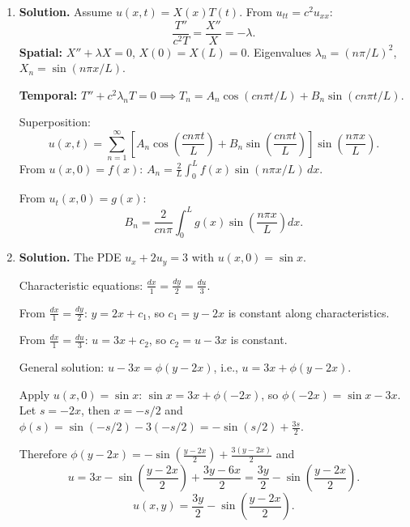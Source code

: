 \begin{enumerate}
\textbf{$Y$-problem:} $Y''-\lambda_n Y=0$, $Y(0)=0$. General solution: $Y=A\cosh(n\pi y/L)+B\sinh(n\pi y/L)$. From $Y(0)=0$: $A=0$, so $Y_n=\sinh(n\pi y/L)$.

Superposition:
\[
u(x,y)=\sum_{n=1}^{\infty}B_n\sin\!\left(\frac{n\pi x}{L}\right)\sinh\!\left(\frac{n\pi y}{L}\right).
\]
Apply $u(x,H)=g(x)$:
\[
g(x)=\sum_{n=1}^{\infty}B_n\sinh\!\left(\frac{n\pi H}{L}\right)\sin\!\left(\frac{n\pi x}{L}\right).
\]
\[
\boxed{B_n = \frac{2}{L\sinh(n\pi H/L)}\int_0^L g(x)\sin\!\left(\frac{n\pi x}{L}\right)dx}.
\]

\item \textbf{Solution.}
Assume $u(x,t)=X(x)T(t)$. From $u_{tt}=c^2 u_{xx}$:
\[
\frac{T''}{c^2 T}=\frac{X''}{X}=-\lambda.
\]
\textbf{Spatial:} $X''+\lambda X=0$, $X(0)=X(L)=0$. Eigenvalues $\lambda_n=(n\pi/L)^2$, $X_n=\sin(n\pi x/L)$.

\textbf{Temporal:} $T''+c^2\lambda_n T=0 \implies T_n=A_n\cos(cn\pi t/L)+B_n\sin(cn\pi t/L)$.

Superposition:
\[
u(x,t)=\sum_{n=1}^{\infty}\left[A_n\cos\!\left(\frac{cn\pi t}{L}\right)+B_n\sin\!\left(\frac{cn\pi t}{L}\right)\right]\sin\!\left(\frac{n\pi x}{L}\right).
\]
From $u(x,0)=f(x)$: $A_n=\frac{2}{L}\int_0^L f(x)\sin(n\pi x/L)\,dx$.

From $u_t(x,0)=g(x)$:
\[
\boxed{B_n = \frac{2}{cn\pi}\int_0^L g(x)\sin\!\left(\frac{n\pi x}{L}\right)dx}.
\]

\item \textbf{Solution.}
The PDE $u_x+2u_y=3$ with $u(x,0)=\sin x$.

Characteristic equations: $\frac{dx}{1}=\frac{dy}{2}=\frac{du}{3}$.

From $\frac{dx}{1}=\frac{dy}{2}$: $y=2x+c_1$, so $c_1=y-2x$ is constant along characteristics.

From $\frac{dx}{1}=\frac{du}{3}$: $u=3x+c_2$, so $c_2=u-3x$ is constant.

General solution: $u-3x=\phi(y-2x)$, i.e., $u=3x+\phi(y-2x)$.

Apply $u(x,0)=\sin x$: $\sin x = 3x+\phi(-2x)$, so $\phi(-2x)=\sin x-3x$. Let $s=-2x$, then $x=-s/2$ and $\phi(s)=\sin(-s/2)-3(-s/2)=-\sin(s/2)+\frac{3s}{2}$.

Therefore $\phi(y-2x)=-\sin\!\left(\frac{y-2x}{2}\right)+\frac{3(y-2x)}{2}$ and
\[
u = 3x-\sin\!\left(\frac{y-2x}{2}\right)+\frac{3y-6x}{2} = \frac{3y}{2}-\sin\!\left(\frac{y-2x}{2}\right).
\]
\[
\boxed{u(x,y)=\frac{3y}{2}-\sin\!\left(\frac{y-2x}{2}\right)}.
\]


\end{enumerate}

